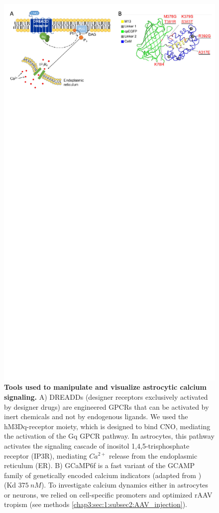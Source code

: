 \begin{figure}[h]
    \centering
    \includegraphics[trim={0 540 0 0},clip,width=\textwidth]{Figures/Chapter4/intro_dreadd_molecular.pdf}
    \caption[Tools used to manipulate and visualize astrocytic calcium signaling]{\textbf{Tools used to manipulate and visualize astrocytic calcium signaling.} 
    A) DREADDs (designer receptors exclusively activated by designer drugs) are engineered GPCRs that can be activated by inert chemicals and not by endogenous ligands. 
    We used the hM3Dq-receptor moiety, which is designed to bind CNO, mediating the activation of the Gq GPCR pathway. 
    In astrocytes, this pathway activates the signaling cascade of inositol 1,4,5-trisphosphate receptor (IP3R), mediating $Ca^{2+}$ release from the endoplasmic reticulum (ER). 
    B) GCaMP6f is a fast variant of the GCAMP family of genetically encoded calcium indicators (adapted from \cite{chen2013}) (Kd $375\ nM$). 
    To investigate calcium dynamics either in astrocytes or neurons, we relied on cell-specific promoters and optimized rAAV tropism (see methods \ref{chap3:sec:1:subsec2:AAV_injection}).}
    \label{fig:chap4:intro_dreadd_molecular}
\end{figure}
